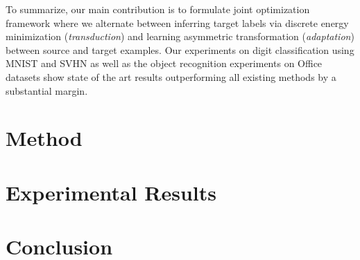 \documentclass{article}
\begin{document}
To summarize, our main contribution is to formulate joint optimization framework where we alternate between inferring target labels via discrete energy minimization (\textit{transduction}) and learning asymmetric transformation (\textit{adaptation}) between source and target examples. Our experiments on digit classification using MNIST \cite{mnist} and SVHN\cite{svhn} as well as the object recognition experiments on Office \cite{office} datasets show state of the art results outperforming all existing methods by a substantial margin.


\section{Method} 



\section{Experimental Results}

\section{Conclusion} 



\clearpage


\end{document}
